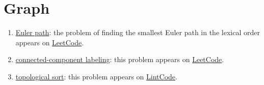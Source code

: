 \section{Graph}
\begin{enumerate}
\item \href{https://en.wikipedia.org/wiki/Eulerian_path}{Euler path}: the problem of finding the smallest Euler path in the lexical order appears on \href{https://leetcode.com/problems/reconstruct-itinerary/}{LeetCode}.
\item \href{https://en.wikipedia.org/wiki/Connected-component_labeling}{connected-component labeling}: this problem appears on \href{https://leetcode.com/problems/number-of-islands/}{LeetCode}.
\item \href{https://en.wikipedia.org/wiki/Topological_sorting}{topological sort}: this problem appears on \href{http://www.lintcode.com/en/problem/topological-sorting/}{LintCode}.
\end{enumerate}

\printbibliography[heading=subbibliography]
